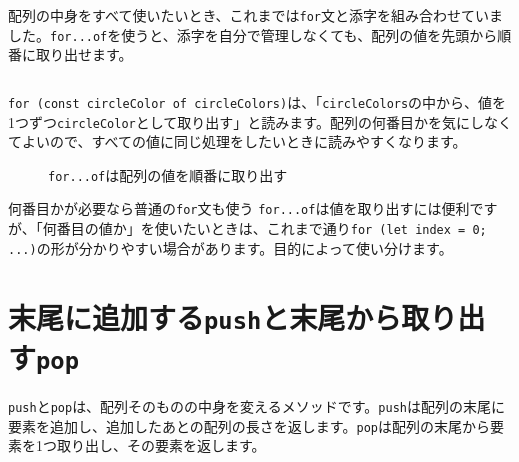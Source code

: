 配列の中身をすべて使いたいとき、これまでは\texttt{for}文と添字を組み合わせていました。\texttt{for...of}を使うと、添字を自分で管理しなくても、配列の値を先頭から順番に取り出せます。

\begin{listing}[htbp]
\inputminted{ts}{typescript-p5/listings/chapter18-iteration/for-of-colors.ts}
\caption{\texttt{for...of}で色のリストを順番に使う（\texttt{chapter18-iteration/for-of-colors.ts}）}
\label{lst:chapter18-iteration-for-of-colors}
\end{listing}

\texttt{for (const circleColor of circleColors)}は、「\texttt{circleColors}の中から、値を1つずつ\texttt{circleColor}として取り出す」と読みます。配列の何番目かを気にしなくてよいので、すべての値に同じ処理をしたいときに読みやすくなります。

\begin{figure}[htbp]
    \centering
    \caption{\texttt{for...of}は配列の値を順番に取り出す}
    \label{fig:chapter18-iteration-for-of}
\end{figure}

\begin{notebox}{何番目かが必要なら普通の\texttt{for}文も使う}
\texttt{for...of}は値を取り出すには便利ですが、「何番目の値か」を使いたいときは、これまで通り\texttt{for (let index = 0; ...)}の形が分かりやすい場合があります。目的によって使い分けます。
\end{notebox}

\section{末尾に追加する\texttt{push}と末尾から取り出す\texttt{pop}}

\texttt{push}と\texttt{pop}は、配列そのものの中身を変えるメソッドです。\texttt{push}は配列の末尾に要素を追加し、追加したあとの配列の長さを返します。\texttt{pop}は配列の末尾から要素を1つ取り出し、その要素を返します。

